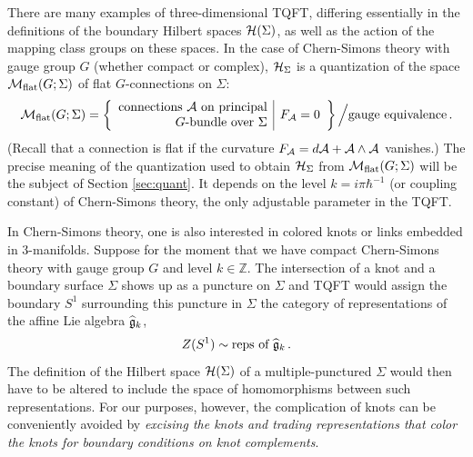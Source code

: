 \documentclass[letterpaper,12pt]{article}
\numberwithin{equation}{section}
\newcommand{\be}{\begin{equation}}
\newcommand{\ee}{\end{equation}}
\newcommand{\Z}{{\mathbb{Z}}}
\newcommand{\CA}{{\cal A}}
\newcommand{\CH}{{\cal H}}
\newcommand{\CM}{{\cal M}}
\renewcommand{\=}{\;=\;}
\begin{document}
There are many examples of three-dimensional TQFT, differing essentially in the definitions of the boundary Hilbert spaces $\CH(\Sigma)$, as well as the action of the mapping class groups on these spaces. In the case of Chern-Simons theory with gauge group $G$ (whether compact or complex), $\CH_\Sigma$ is a quantization of the space $\CM_{{\rm flat}} (G;\Sigma)$ of flat $G$-connections on $\Sigma$:
%
\be  \CM_{{\rm flat}} (G;\Sigma) = \left\{\begin{array}{r|l}
  \text{connections $\CA$ on principal} & \multirow{2}{*}{$F_\CA=0$} \\
  \text{$G$-bundle over $\Sigma$} &
  \end{array}\right\}\Big/ \text{gauge equivalence}\,.
\ee
%
(Recall that a connection is flat if the curvature $F_\CA=d\CA+\CA\wedge \CA$ vanishes.)
The precise meaning of the quantization used to obtain $\CH_\Sigma$ from $\CM_{{\rm flat}} (G;\Sigma)$ will be the subject of Section \ref{sec:quant}. It depends on the level $k=i\pi\hbar^{-1}$ (or coupling constant) of Chern-Simons theory, the only adjustable parameter in the TQFT.

In Chern-Simons theory, one is also interested in colored knots or links embedded in 3-manifolds.
Suppose for the moment that we have compact Chern-Simons theory with gauge group $G$ and level $k\in \Z$.
The intersection of a knot and a boundary surface $\Sigma$ shows up as a puncture on $\Sigma$ and TQFT would assign the boundary $S^1$ surrounding this puncture in $\Sigma$ the category of representations of the affine Lie algebra $\widehat{\frak g}_{k}$,
%
\be Z(S^1) \sim \text{reps of $\widehat{\frak g}_k$}\,. \ee
%
The definition of the Hilbert space $\CH(\Sigma)$ of a multiple-punctured $\Sigma$ would then have to be altered to include the space of homomorphisms between such representations. For our purposes, however, the complication of knots can be conveniently avoided by \emph{excising the knots and trading representations that color the knots for boundary conditions on knot complements}.
\end{document}
